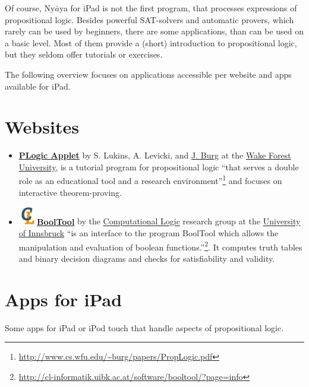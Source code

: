 
Of course, Ny$\bar{a}$ya for iPad is not the first program,  that processes expressions of propositional logic. 
Besides powerful SAT-solvers and automatic provers, which rarely can be used by beginners,
there are some applications, than can be used on a basic level.  
Most of them provide a (short) introduction to propositional logic, but they seldom offer tutorials or exercises. 	

The following overview focuses on applications accessible
per website and apps available for iPad.

\section{Websites}

\begin{itemize}
\item 
\href{http://www.cs.wfu.edu/~burg/JavaPackages/indexswingnet.html}{\bf PLogic Applet} 
by S. Lukins, A. Levicki, and 
\href{http://www.cs.wfu.edu/~burg}{J. Burg} at the
\href{http://www.cs.wfu.edu}{Wake Forest University}, is a
tutorial program for propositional logic 
“that serves a double role as an educational tool and a research environment”\footnote {
\url{http://www.cs.wfu.edu/~burg/papers/PropLogic.pdf}} and focuses 
 on interactive theorem-proving.

\item
\href{http://cl-informatik.uibk.ac.at/software/booltool/}{\bf 
\includegraphics[width=0.8cm]{clshortlogo_new.pdf}BoolTool} 
by the 
\href{http://cl-informatik.uibk.ac.at/}{Computational Logic} 
research group at the 
\href{http://informatik.uibk.ac.at}{University of Innsbruck}
“is an interface to the program BoolTool which allows the manipulation and evaluation of boolean functions.”\footnote{
\url{http://cl-informatik.uibk.ac.at/software/booltool/?page=info}}. 
It computes truth tables and binary decision diagrams and checks for satisfiability and validity.

\end{itemize}

\section{Apps for iPad}
 
Some apps for iPad or iPod touch that handle aspects of propositional logic.

